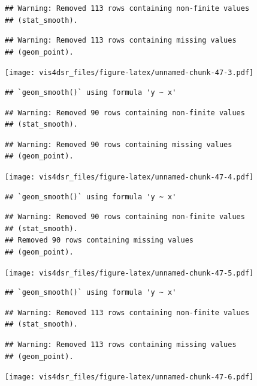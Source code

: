 \documentclass[
]{krantz}
\begin{document}
\begin{verbatim}
## Warning: Removed 113 rows containing non-finite values
## (stat_smooth).
\end{verbatim}

\begin{verbatim}
## Warning: Removed 113 rows containing missing values
## (geom_point).
\end{verbatim}

\texttt{[image: vis4dsr\_files/figure-latex/unnamed-chunk-47-3.pdf]}

\begin{verbatim}
## `geom_smooth()` using formula 'y ~ x'
\end{verbatim}

\begin{verbatim}
## Warning: Removed 90 rows containing non-finite values
## (stat_smooth).
\end{verbatim}

\begin{verbatim}
## Warning: Removed 90 rows containing missing values
## (geom_point).
\end{verbatim}

\texttt{[image: vis4dsr\_files/figure-latex/unnamed-chunk-47-4.pdf]}

\begin{verbatim}
## `geom_smooth()` using formula 'y ~ x'
\end{verbatim}

\begin{verbatim}
## Warning: Removed 90 rows containing non-finite values
## (stat_smooth).
## Removed 90 rows containing missing values
## (geom_point).
\end{verbatim}

\texttt{[image: vis4dsr\_files/figure-latex/unnamed-chunk-47-5.pdf]}

\begin{verbatim}
## `geom_smooth()` using formula 'y ~ x'
\end{verbatim}

\begin{verbatim}
## Warning: Removed 113 rows containing non-finite values
## (stat_smooth).
\end{verbatim}

\begin{verbatim}
## Warning: Removed 113 rows containing missing values
## (geom_point).
\end{verbatim}

\texttt{[image: vis4dsr\_files/figure-latex/unnamed-chunk-47-6.pdf]}
\end{document}
